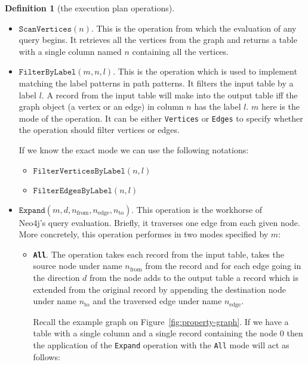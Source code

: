 \documentclass[14pt]{constructor-thesis}
\theoremstyle{definition}
\newtheorem{definition}{Definition}
\begin{document}
\begin{definition}[the execution plan operations] $ $
  \begin{itemize}
    \item $\texttt{ScanVertices}(n)$. This is the operation from which the evaluation of any query begins. It retrieves all the vertices from the graph and returns a table with a single column named $n$ containing all the vertices.

    \item $\texttt{FilterByLabel}(m, n, l)$. This is the operation which is used to implement matching the label patterns in path patterns.
    It filters the input table by a label $l$. A record from the input table will make into the output table iff the graph object (a vertex or an edge) in column $n$ has the label $l$. $m$ here is the mode of the operation. It can be either \texttt{Vertices} or \texttt{Edges} to specify whether the operation should filter vertices or edges.

    If we know the exact mode we can use the following notations:
    \begin{itemize}
      \item $\texttt{FilterVerticesByLabel}(n, l)$
      \item $\texttt{FilterEdgesByLabel}(n, l)$
    \end{itemize}

    \item $\texttt{Expand}(m, d, n_{\mathrm{from}}, n_{\mathrm{edge}}, n_{\mathrm{to}})$. This operation is the workhorse of \\ Neo4j's query evaluation. Briefly, it traverses one edge from each given node. More concretely, this operation performes in two modes specified by $m$:
    \begin{itemize}
      \item \textbf{\texttt{All}}.
      The operation takes each record from the input table, takes the source node under name $n_{\mathrm{from}}$ from the record and for each edge going in the direction $d$ from the node adds to the output table a record which is extended from the original record by appending the destination node under name $n_{\mathrm{to}}$ and the traversed edge under name $n_{\mathrm{edge}}$.

      Recall the example graph on Figure~\ref{fig:property-graph}. If we have a table with a single column and a single record containing the node 0 then the application of the \texttt{Expand} operation with the \texttt{All} mode will act as follows:


\end{itemize}
\end{itemize}
\end{definition}
\end{document}
